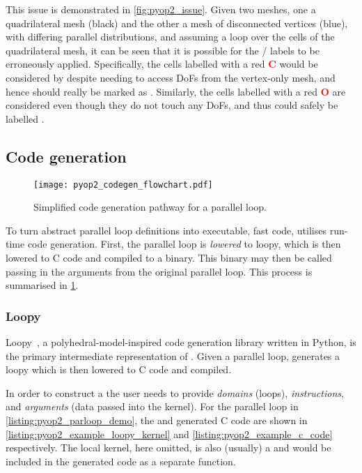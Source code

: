 \documentclass[thesis]{subfiles}
\begin{document}
This issue is demonstrated in \cref{fig:pyop2_issue}.
Given two meshes, one a quadrilateral mesh (black) and the other a mesh of disconnected vertices (blue), with differing parallel distributions, and assuming a loop over the cells of the quadrilateral mesh, it can be seen that it is possible for the \coreiter{}/\ownediter{} labels to be erroneously applied.
Specifically, the cells labelled with a red \textbf{\textcolor{red}{C}} would be considered \coreiter{} by  despite needing to access \ghostiter{} DoFs from the vertex-only mesh, and hence should really be marked as \ownediter{}.
Similarly, the cells labelled with a red \textbf{\textcolor{red}{O}} are considered \ownediter{} even though they do not touch any \ghostiter{} DoFs, and thus could safely be labelled \coreiter{}.

\subsection{Code generation}
\label{sec:pyop2_codegen}

\begin{figure}
  \texttt{[image: pyop2\_codegen\_flowchart.pdf]}
  \caption{Simplified code generation pathway for a  parallel loop.}
  \label{fig:pyop2_codegen}
\end{figure}

To turn abstract parallel loop definitions into executable, fast code,  utilises run-time code generation.
First, the parallel loop is \emph{lowered} to loopy, which is then lowered to C code and compiled to a binary.
This binary may then be called passing in the arguments from the original parallel loop.
This process is summarised in \cref{fig:pyop2_codegen}.

\subsubsection{Loopy}

Loopy~\cite{klocknerLoopyTransformationbasedCode2014}, a polyhedral-model-inspired code generation library written in Python, is the primary intermediate representation of .
Given a parallel loop,  generates a loopy  which is then lowered to C code and compiled.

In order to construct a  the user needs to provide \emph{domains} (loops), \emph{instructions}, and \emph{arguments} (data passed into the kernel).
For the parallel loop in \cref{listing:pyop2_parloop_demo}, the  and generated C code are shown in \cref{listing:pyop2_example_loopy_kernel} and \cref{listing:pyop2_example_c_code} respectively.
The local kernel, here omitted, is also (usually) a  and would be included in the generated code as a separate function.
\end{document}
